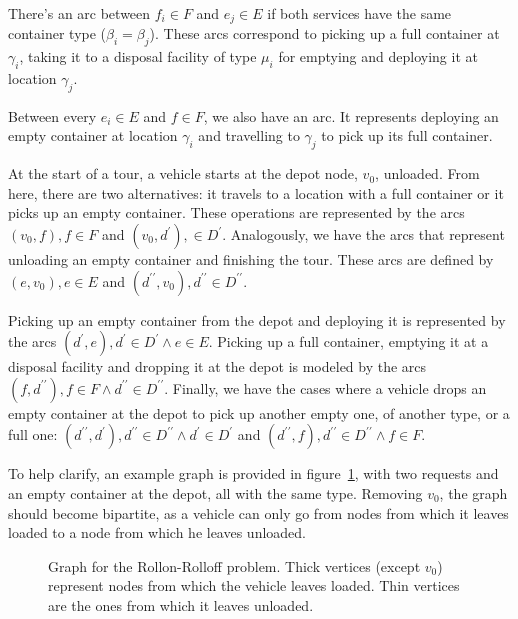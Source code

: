 There's an arc between $f_i \in F$ and $e_j \in E$ if both services have the
same container type ($\beta_i = \beta_j$). These arcs correspond to picking up
a full container at $\gamma_i$, taking it to a disposal facility of type
$\mu_i$ for emptying and deploying it at location $\gamma_j$.

Between every $e_i \in E$ and $f \in F$, we also have an arc. It represents
deploying an empty container at location $\gamma_i$ and travelling to
$\gamma_j$ to pick up its full container.

At the start of a tour, a vehicle starts at the depot node, $v_0$, unloaded.
From here, there are two alternatives: it travels to a location with a full
container or it picks up an empty container. These operations are represented
by the arcs $(v_0, f), f \in F$ and $(v_0, d^\prime), \in D^\prime$.
Analogously, we have the arcs that represent unloading an empty container and
finishing the tour. These arcs are defined by $(e, v_0), e \in E$ and
$(d^{\prime\prime}, v_0), d^{\prime\prime} \in D^{\prime\prime}$.

Picking up an empty container from the depot and deploying it is represented by
the arcs $(d^\prime, e), d^\prime \in D^\prime \wedge e \in E$. Picking up a
full container, emptying it at a disposal facility and dropping it at the depot
is modeled by the arcs $(f, d^{\prime\prime}), f \in F \wedge d^{\prime\prime}
\in D^{\prime\prime}$. Finally, we have the cases where a vehicle drops an
empty container at the depot to pick up another empty one, of another type, or
a full one: $(d^{\prime\prime}, d^\prime), d^{\prime\prime} \in
D^{\prime\prime} \wedge d^\prime \in D^\prime$ and $(d^{\prime\prime}, f),
d^{\prime\prime} \in D^{\prime\prime} \wedge f \in F$.

To help clarify, an example graph is provided in figure~\ref{fig:avrp-rr}, with
two requests and an empty container at the depot, all with the same type.
Removing $v_0$, the graph should become bipartite, as a vehicle can only go
from nodes from which it leaves loaded to a node from which he leaves unloaded.

\begin{figure}[th]
  \begin{center}
    \leavevmode
    
    \caption{Graph for the Rollon-Rolloff problem. Thick vertices (except
    $v_0$) represent nodes from which the vehicle leaves loaded. Thin vertices
    are the ones from which it leaves unloaded.}
    \label{fig:avrp-rr}
  \end{center}
\end{figure}


